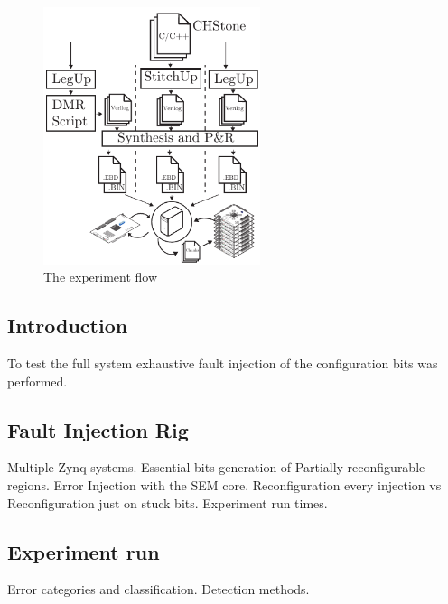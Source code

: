 
\begin{figure}[h]
\centering
\includegraphics[width=2.5in]{./imgs/ExperimentFlowVert.pdf}
\caption{The experiment flow}
\label{fig:ExperimentFlow}
\end{figure}

\subsection{Introduction}
To test the full system exhaustive fault injection of the configuration bits was performed.

\subsection{Fault Injection Rig}
Multiple Zynq systems. Essential bits generation of Partially reconfigurable regions.
Error Injection with the SEM core. Reconfiguration every injection vs Reconfiguration just
on stuck bits. Experiment run times.

\subsection{Experiment run}
Error categories and classification.
Detection methods.

